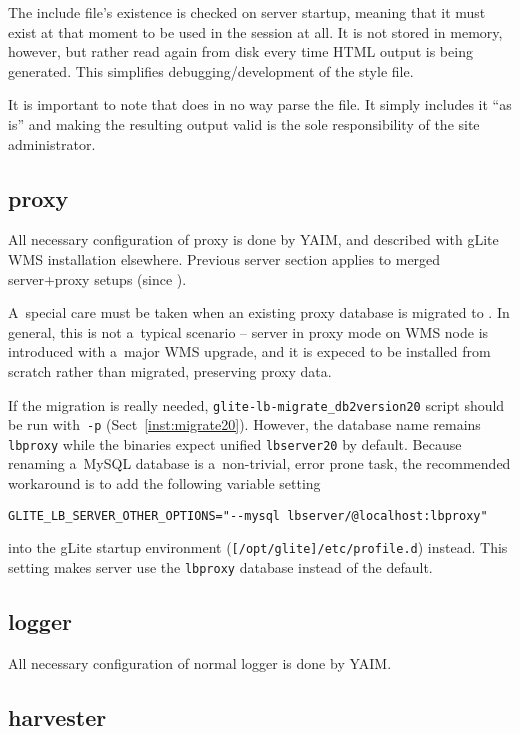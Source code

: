 The include file's existence is checked on server startup, meaning that it must exist at that moment to be used in the session at all. It is not stored in memory, however, but rather read again from disk every time HTML output is being generated. This simplifies debugging/development of the style file.

It is important to note that \LB does in no way parse the file. It simply includes it ``as is'' and making the resulting output valid is the sole responsibility of the site administrator.

\subsection{\LB proxy}
\label{inst:LBproxy}


All necessary configuration of \LB proxy is done by YAIM,
and described with gLite WMS installation elsewhere.
Previous \LB server section applies to merged server+proxy setups (since ).

A~special care must be taken when an existing \LB proxy database
is migrated to .
In general, this is not a~typical scenario --  server in proxy mode
on WMS node is introduced with a~major WMS upgrade, and it is expeced
to be installed from scratch rather than migrated, preserving \LB proxy data.

If the migration is really needed, \verb'glite-lb-migrate_db2version20'
script should be run with~\verb'-p' (Sect~\ref{inst:migrate20}).
However, the \LB database name remains \verb'lbproxy' while
the  binaries expect unified \verb'lbserver20' by default.
Because renaming a~MySQL database is a~non-trivial, error prone task,
the recommended workaround is to add the following variable setting

\verb'GLITE_LB_SERVER_OTHER_OPTIONS="--mysql lbserver/@localhost:lbproxy"' 

into the gLite startup environment (\verb'[/opt/glite]/etc/profile.d') instead.
This setting makes \LB server use the \verb'lbproxy' database instead of the default.

\subsection{\LB logger}

All necessary configuration of normal \LB logger is done by YAIM.

\subsection{\LB harvester}


